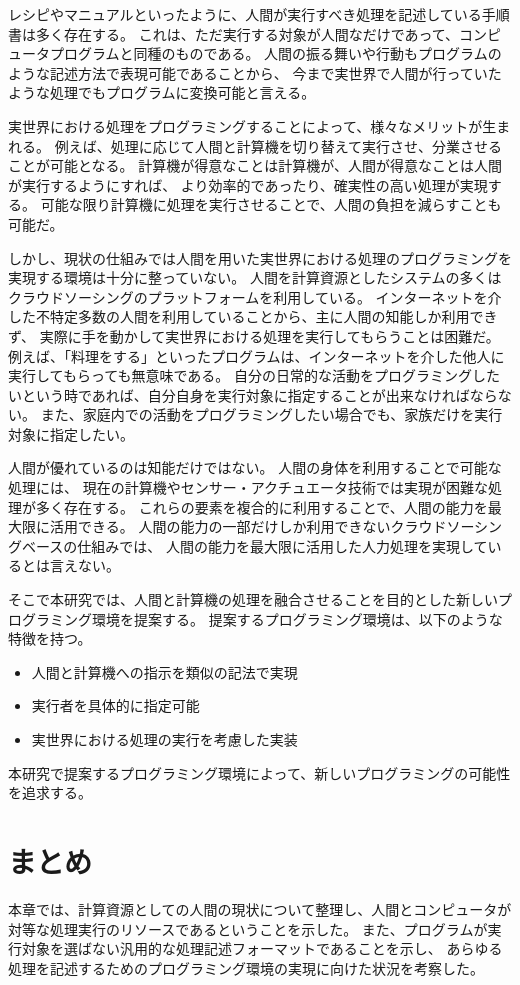 レシピやマニュアルといったように、人間が実行すべき処理を記述している手順書は多く存在する。
これは、ただ実行する対象が人間なだけであって、コンピュータプログラムと同種のものである。
人間の振る舞いや行動もプログラムのような記述方法で表現可能であることから、
今まで実世界で人間が行っていたような処理でもプログラムに変換可能と言える。

実世界における処理をプログラミングすることによって、様々なメリットが生まれる。
例えば、処理に応じて人間と計算機を切り替えて実行させ、分業させることが可能となる。
計算機が得意なことは計算機が、人間が得意なことは人間が実行するようにすれば、
より効率的であったり、確実性の高い処理が実現する。
可能な限り計算機に処理を実行させることで、人間の負担を減らすことも可能だ。

しかし、現状の仕組みでは人間を用いた実世界における処理のプログラミングを実現する環境は十分に整っていない。
人間を計算資源としたシステムの多くはクラウドソーシングのプラットフォームを利用している。
インターネットを介した不特定多数の人間を利用していることから、主に人間の知能しか利用できず、
実際に手を動かして実世界における処理を実行してもらうことは困難だ。
例えば、「料理をする」といったプログラムは、インターネットを介した他人に実行してもらっても無意味である。
自分の日常的な活動をプログラミングしたいという時であれば、自分自身を実行対象に指定することが出来なければならない。
また、家庭内での活動をプログラミングしたい場合でも、家族だけを実行対象に指定したい。

人間が優れているのは知能だけではない。
人間の身体を利用することで可能な処理には、
現在の計算機やセンサー・アクチュエータ技術では実現が困難な処理が多く存在する。
これらの要素を複合的に利用することで、人間の能力を最大限に活用できる。
人間の能力の一部だけしか利用できないクラウドソーシングベースの仕組みでは、
人間の能力を最大限に活用した人力処理を実現しているとは言えない。

そこで本研究では、人間と計算機の処理を融合させることを目的とした新しいプログラミング環境を提案する。
提案するプログラミング環境は、以下のような特徴を持つ。

\begin{itemize}
\itemsep1pt\parskip0pt
\item
  人間と計算機への指示を類似の記法で実現
\item
  実行者を具体的に指定可能
\item
  実世界における処理の実行を考慮した実装
\end{itemize}

本研究で提案するプログラミング環境によって、新しいプログラミングの可能性を追求する。

\section{まとめ}\label{ux307eux3068ux3081}

本章では、計算資源としての人間の現状について整理し、人間とコンピュータが対等な処理実行のリソースであるということを示した。
また、プログラムが実行対象を選ばない汎用的な処理記述フォーマットであることを示し、
あらゆる処理を記述するためのプログラミング環境の実現に向けた状況を考察した。
